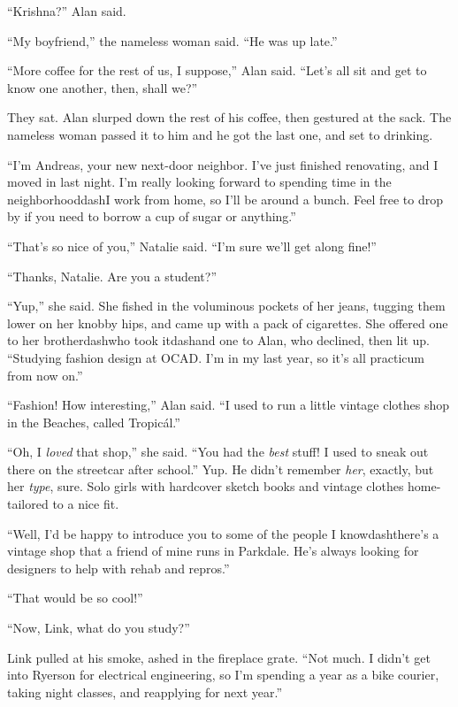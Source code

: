 ``Krishna?'' Alan said.

``My boyfriend,'' the nameless woman said.  ``He was up late.''

``More coffee for the rest of us, I suppose,'' Alan said.  ``Let's all
sit and get to know one another, then, shall we?''

They sat.  Alan slurped down the rest of his coffee, then gestured at
the sack.  The nameless woman passed it to him and he got the last
one, and set to drinking.

``I'm Andreas, your new next-door neighbor.  I've just finished
renovating, and I moved in last night.  I'm really looking forward to
spending time in the neighborhooddash{}I work from home, so I'll be
around a bunch.  Feel free to drop by if you need to borrow a cup of
sugar or anything.''

``That's so nice of you,'' Natalie said.  ``I'm sure we'll get along
fine!''

``Thanks, Natalie.  Are you a student?''

``Yup,'' she said.  She fished in the voluminous pockets of her jeans,
tugging them lower on her knobby hips, and came up with a pack of
cigarettes.  She offered one to her brotherdash{}who took itdash{}and one to
Alan, who declined, then lit up.  ``Studying fashion design at OCAD. 
I'm in my last year, so it's all practicum from now on.''

``Fashion!  How interesting,'' Alan said.  ``I used to run a little
vintage clothes shop in the Beaches, called Tropic\'{a}l.''

``Oh, I \textit{loved} that shop,'' she said.  ``You had the
\textit{best} stuff!  I used to sneak out there on the streetcar after
school.'' Yup.  He didn't remember \textit{her}, exactly, but her
\textit{type}, sure.  Solo girls with hardcover sketch books and
vintage clothes home-tailored to a nice fit.

``Well, I'd be happy to introduce you to some of the people I
knowdash{}there's a vintage shop that a friend of mine runs in Parkdale. 
He's always looking for designers to help with rehab and repros.''

``That would be so cool!''

``Now, Link, what do you study?''

Link pulled at his smoke, ashed in the fireplace grate.  ``Not much. 
I didn't get into Ryerson for electrical engineering, so I'm spending
a year as a bike courier, taking night classes, and reapplying for
next year.''

